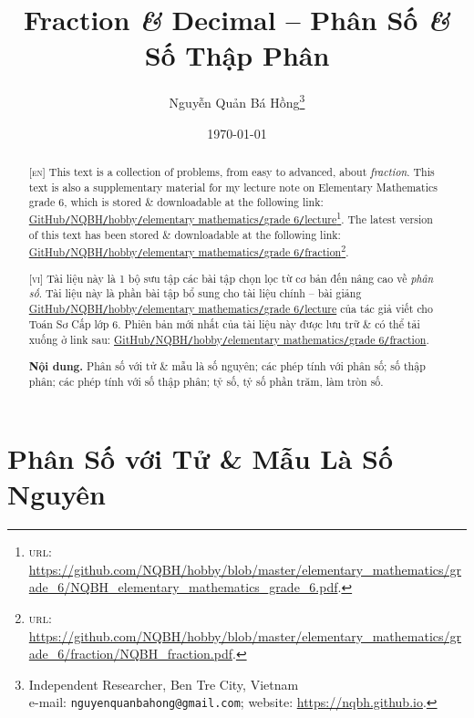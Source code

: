 \documentclass{article}
\title{Fraction \textit{\&} Decimal -- Phân Số \textit{\&} Số Thập Phân}
\author{Nguyễn Quản Bá Hồng\footnote{Independent Researcher, Ben Tre City, Vietnam\\e-mail: \texttt{nguyenquanbahong@gmail.com}; website: \url{https://nqbh.github.io}.}}
\date{\today}
\begin{document}
\maketitle
\begin{abstract}
	\textsc{[en]} This text is a collection of problems, from easy to advanced, about \textit{fraction}. This text is also a supplementary material for my lecture note on Elementary Mathematics grade 6, which is stored \& downloadable at the following link: \href{https://github.com/NQBH/hobby/blob/master/elementary_mathematics/grade_6/NQBH_elementary_mathematics_grade_6.pdf}{GitHub\texttt{/}NQBH\texttt{/}hobby\texttt{/}elementary mathematics\texttt{/}grade 6\texttt{/}lecture}\footnote{\textsc{url}: \url{https://github.com/NQBH/hobby/blob/master/elementary_mathematics/grade_6/NQBH_elementary_mathematics_grade_6.pdf}.}. The latest version of this text has been stored \& downloadable at the following link: \href{https://github.com/NQBH/hobby/blob/master/elementary_mathematics/grade_6/fraction/NQBH_fraction.pdf}{GitHub\texttt{/}NQBH\texttt{/}hobby\texttt{/}elementary mathematics\texttt{/}grade 6\texttt{/}fraction}\footnote{\textsc{url}: \url{https://github.com/NQBH/hobby/blob/master/elementary_mathematics/grade_6/fraction/NQBH_fraction.pdf}.}.
	\vspace{2mm}
	
	\textsc{[vi]} Tài liệu này là 1 bộ sưu tập các bài tập chọn lọc từ cơ bản đến nâng cao về \textit{phân số}. Tài liệu này là phần bài tập bổ sung cho tài liệu chính -- bài giảng \href{https://github.com/NQBH/hobby/blob/master/elementary_mathematics/grade_6/NQBH_elementary_mathematics_grade_6.pdf}{GitHub\texttt{/}NQBH\texttt{/}hobby\texttt{/}elementary mathematics\texttt{/}grade 6\texttt{/}lecture} của tác giả viết cho Toán Sơ Cấp lớp 6. Phiên bản mới nhất của tài liệu này được lưu trữ \& có thể tải xuống ở link sau: \href{https://github.com/NQBH/hobby/blob/master/elementary_mathematics/grade_6/fraction/NQBH_fraction.pdf}{GitHub\texttt{/}NQBH\texttt{/}hobby\texttt{/}elementary mathematics\texttt{/}grade 6\texttt{/}fraction}.
	
	\textsf{\textbf{Nội dung.} Phân số với tử \& mẫu là số nguyên; các phép tính với phân số; số thập phân; các phép tính với số thập phân; tỷ số, tỷ số phần trăm, làm tròn số.}
\end{abstract}
\tableofcontents


\section{Phân Số với Tử \& Mẫu Là Số Nguyên}
\end{document}
